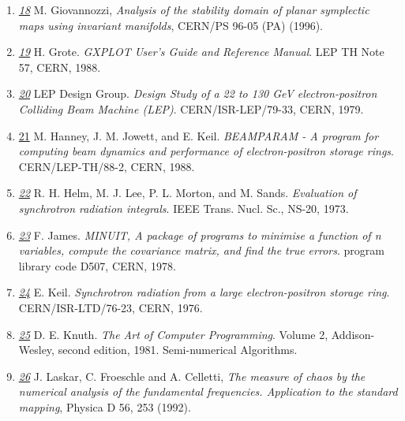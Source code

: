 \begin{enumerate}
	\item \href{giovanozzi}{\textit{18}} M. Giovannozzi,
          \textit{Analysis of the stability domain of planar symplectic
            maps using invariant manifolds}, CERN/PS 96-05 (PA) (1996). 

	\item \href{gxplot}{\textit{19}} H. Grote. \textit{GXPLOT User's
          Guide and Reference Manual}. LEP TH Note 57, CERN, 1988. 

	\item \href{lep}{\textit{20}} LEP Design Group. \textit{Design
          Study of a 22 to 130 GeV electron-positron Colliding Beam
          Machine   (LEP)}. CERN/ISR-LEP/79-33, CERN, 1979. 

	\item \href{beamparam<i}{21} M. Hanney, J. M. Jowett, and
          E. Keil. \textit{BEAMPARAM - A program for computing beam
            dynamics and   performance of electron-positron storage
            rings}. CERN/LEP-TH/88-2, CERN, 1988. 

	\item \href{helm}{\textit{22}} R. H. Helm, M. J. Lee,
          P. L. Morton, and M. Sands. \textit{Evaluation of synchrotron
            radiation integrals}. IEEE Trans. Nucl. Sc., NS-20, 1973. 

	\item \href{minuit}{\textit{23}} F. James. \textit{MINUIT, A
          package of programs to minimise a function of n   variables,
          compute the covariance matrix, and find the true
          errors}. program library code D507, CERN, 1978. 
	\label{bib:minuit}

	\item \href{keil}{\textit{24}} E. Keil. \textit{Synchrotron
          radiation from a large electron-positron storage
          ring}. CERN/ISR-LTD/76-23, CERN, 1976. 

	\item \href{knuth}{\textit{25}} D. E. Knuth. \textit{The Art of
          Computer Programming}. Volume 2, Addison-Wesley, second
          edition, 1981. Semi-numerical Algorithms. 
	\label{bib:knuth}

	\item \href{laskar}{\textit{26}} J. Laskar, C. Froeschle and
          A. Celletti, \textit{The measure of chaos by the numerical
            analysis of the fundamental   frequencies. Application to
            the standard mapping}, Physica D 56, 253 (1992). 


\end{enumerate}

